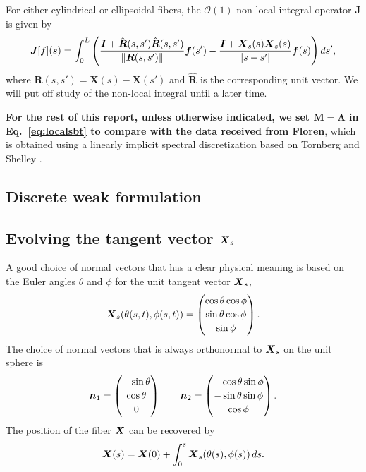 For either cylindrical or ellipsoidal fibers, the $\mathcal{O}(1)$ non-local integral operator $\bm{J}$ is given by
\begin{equation}
\label{eq:intsbt}
\boldsymbol{J}[f](s) = \int_0^L \left(\frac{\boldsymbol{I}+\hat{\boldsymbol{R}}(s,s')\hat{\boldsymbol{R}}(s,s')}{\left\Vert \boldsymbol{R}(s,s')\right\Vert}\boldsymbol{f}(s') - \frac{\boldsymbol{I}+\boldsymbol{X}_s(s) \boldsymbol{X}_s(s)}{|s-s'|} \boldsymbol{f}(s) \right) ds',
\end{equation}
where $\bm{R}(s,s')=\bm{X}(s)-\bm{X}(s')$ and $\hat{\bm{R}}$ is the corresponding unit vector. We will put off study of the non-local integral until a later time. 

\textbf{For the rest of this report, unless otherwise indicated, we set $\bm{M}=\bm{\Lambda}$ in Eq.\ \eqref{eq:localsbt} to compare with the data received from Floren}, which is obtained using a linearly implicit spectral discretization based on Tornberg and Shelley \cite{ts04}.



\subsection{Discrete weak formulation}


\subsection{Evolving the tangent vector $\boldsymbol{X}_s$}

A good choice of normal vectors that has a clear physical meaning is based on the Euler angles $\theta$ and $\phi$ for the unit tangent vector $\boldsymbol{X}_s$,
\begin{equation}
\boldsymbol{X}_s(\theta(s,t),\phi(s,t)) = \begin{pmatrix} \cos{\theta} \cos{\phi}\\[2 pt] \sin{\theta} \cos{\phi} \\[2 pt] \sin{\phi} \end{pmatrix}.
\end{equation}
The choice of normal vectors that is always orthonormal to $\boldsymbol{X}_s$ on the unit sphere is
\begin{equation}
\label{eq:nangles}
\boldsymbol{n}_1 =  \begin{pmatrix} -\sin{\theta}\\[2 pt] \cos{\theta}\\[2 pt]0 \end{pmatrix} \qquad \boldsymbol{n}_2 =  \begin{pmatrix} -\cos{\theta} \sin{\phi}\\[2 pt] -\sin{\theta} \sin{\phi} \\[2 pt] \cos{\phi} \end{pmatrix}. 
\end{equation}
The position of the fiber $\boldsymbol{X}$ can be recovered by 
\begin{equation}
\label{eq:XfromXs}
\boldsymbol{X}(s)= \boldsymbol{X}(0)+\int_0^s \boldsymbol{X}_s(\theta(s),\phi(s)) \, ds. 
\end{equation}

